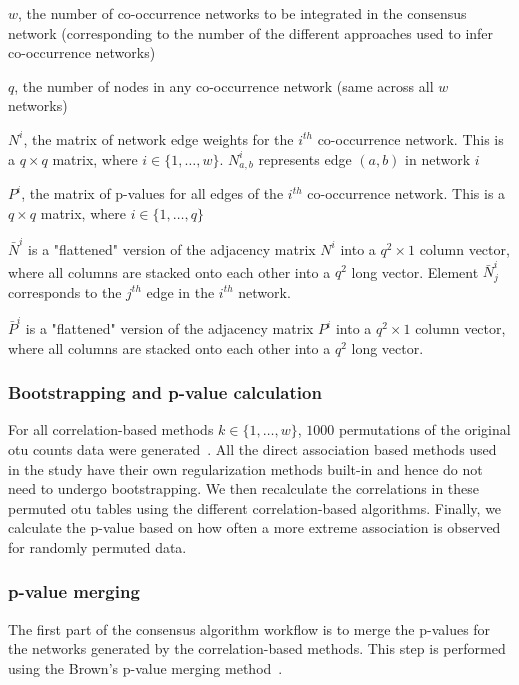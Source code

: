   $w$, the number of co-occurrence networks to be integrated in the consensus network (corresponding to the number of the different approaches used to infer co-occurrence networks)

  $q$, the number of nodes in any co-occurrence network (same across all $w$ networks)

  $N^i$, the matrix of network edge weights for the $i^{th}$ co-occurrence network. This is a $q \times q$ matrix, where $i \in \{1,\dots,w\}$. $N^i_{a,b}$ represents edge $(a,b)$ in network $i$

  $P^i$, the matrix of p-values for all edges of the $i^{th}$ co-occurrence network. This is a $q \times q$ matrix, where $i \in \{1,\dots,q\}$

  $\bar{N}^i$ is a "flattened" version of the adjacency matrix $N^i$ into a $q^2 \times 1$ column vector, where all columns are stacked onto each other into a $q^2$ long vector. Element $\bar{N}^i_j$ corresponds to the $j^{th}$ edge in the $i^{th}$ network.

  $\bar{P}^i$ is a "flattened" version of the adjacency matrix $P^i$ into a $q^2 \times 1$ column vector, where all columns are stacked onto each other into a $q^2$ long vector.

  \subsubsection*{Bootstrapping and p-value calculation}
  For all correlation-based methods $k \in \{1,\dots,w\}$, $1000$ permutations of the original \ac{otu} counts data were generated~\cite{Watts2018}.
  All the direct association based methods used in the study have their own regularization methods built-in and hence do not need to undergo bootstrapping.
  We then recalculate the correlations in these permuted \ac{otu} tables using the different correlation-based algorithms.
  Finally, we calculate the p-value based on how often a more extreme association is observed for randomly permuted data.

  \subsubsection*{p-value merging}

  The first part of the consensus algorithm workflow is to merge the p-values for the networks generated by the correlation-based methods.
  This step is performed using the Brown's p-value merging method~\cite{Poole_Gibbs_Shmulevich_Bernard_Knijnenburg_2016,faustCoNetAppInference2016}.

